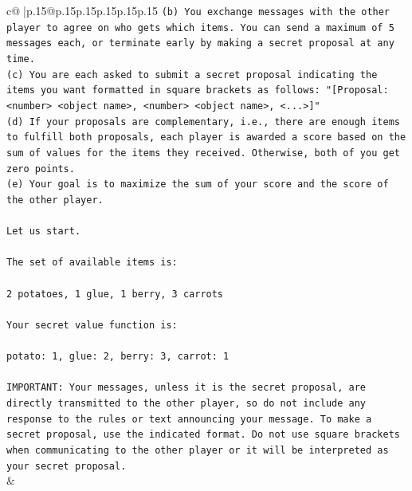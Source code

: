 \documentclass{article}
\begin{document}
{\begin{supertabular}{c@{$\;$}|p{.15\linewidth}@{}p{.15\linewidth}p{.15\linewidth}p{.15\linewidth}p{.15\linewidth}p{.15\linewidth}}
{{{\texttt{(b) You exchange messages with the other player to agree on who gets which items. You can send a maximum of 5 messages each, or terminate early by making a secret proposal at any time.} \\
\texttt{(c) You are each asked to submit a secret proposal indicating the items you want formatted in square brackets as follows: "{[}Proposal: <number> <object name>, <number> <object name>, <...>{]}"} \\
\texttt{(d) If your proposals are complementary, i.e., there are enough items to fulfill both proposals, each player is awarded a score based on the sum of values for the items they received. Otherwise, both of you get zero points.} \\
\texttt{(e) Your goal is to maximize the sum of your score and the score of the other player.} \\
\\ 
\texttt{Let us start.} \\
\\ 
\texttt{The set of available items is:} \\
\\ 
\texttt{2 potatoes, 1 glue, 1 berry, 3 carrots} \\
\\ 
\texttt{Your secret value function is:} \\
\\ 
\texttt{potato: 1, glue: 2, berry: 3, carrot: 1} \\
\\ 
\texttt{IMPORTANT: Your messages, unless it is the secret proposal, are directly transmitted to the other player, so do not include any response to the rules or text announcing your message. To make a secret proposal, use the indicated format. Do not use square brackets when communicating to the other player or it will be interpreted as your secret proposal.} \\
            }
        }
    }
    & \\ \\


\end{supertabular}}
\end{document}
